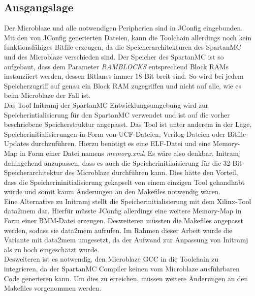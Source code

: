\subsection{Ausgangslage}
Der Microblaze und alle notwendigen Peripherien sind in JConfig eingebunden. Mit den von JConfig generierten Dateien, kann die Toolchain allerdings noch kein funktionsfähiges Bitfile erzeugen, da die Speicherarchitekturen des SpartanMC und des Microblaze verschieden sind. Der Speicher des SpartanMC ist so aufgebaut, dass dem Parameter \textit{RAMBLOCKS} entsprechend Block RAMs instanziiert werden, dessen Bitlanes immer 18-Bit breit sind. So wird bei jedem Speicherzugriff auf genau ein Block RAM zugegriffen und nicht auf alle, wie es beim Microblaze der Fall ist.\\
Das Tool Initramj der SpartanMC Entwicklungsumgebung wird zur Speicherintialisierung für den SpartanMC verwendet und ist auf die vorher beschriebene Speicherstruktur angepasst. Das Tool ist unter anderem in der Lage, Speicherinitialisierungen in Form von UCF-Dateien, Verilog-Dateien oder Bitfile-Updates durchzuführen. Hierzu benötigt es eine ELF-Datei und eine Memory-Map in Form einer Datei namens \textit{memory.xml}. Es wäre also denkbar, Initramj dahingehend anzupassen, dass es auch die Speicherinitilaisierung für die 32-Bit-Speicherarchitektur des Microblaze durchführen kann. Dies hätte den Vorteil, dass die Speicherininitialisierung gekapselt von einem einzigen Tool gehandhabt würde und somit kaum Änderungen an den Makefiles notwendig wären.\\
Eine Alternative zu Initramj stellt die Speicherinitialisierung mit dem Xilinx-Tool data2mem dar. Hierfür müsste JConfig allerdings eine weitere Memory-Map in Form einer BMM-Datei erzeugen. Desweiteren müssten die Makefiles angepasst werden, sodass sie data2mem aufrufen. Im Rahmen dieser Arbeit wurde die Variante mit data2mem umgesetzt, da der Aufwand zur Anpassung von Initramj als zu hoch eingeschätzt wurde.\\
Desweiteren ist es notwendig, den Microblaze GCC in die Toolchain zu integrieren, da der SpartanMC Compiler keinen vom Microblaze ausführbaren Code generieren kann. Um dies zu erreichen, müssen weitere Änderungen an den Makefiles vorgenommen werden.
